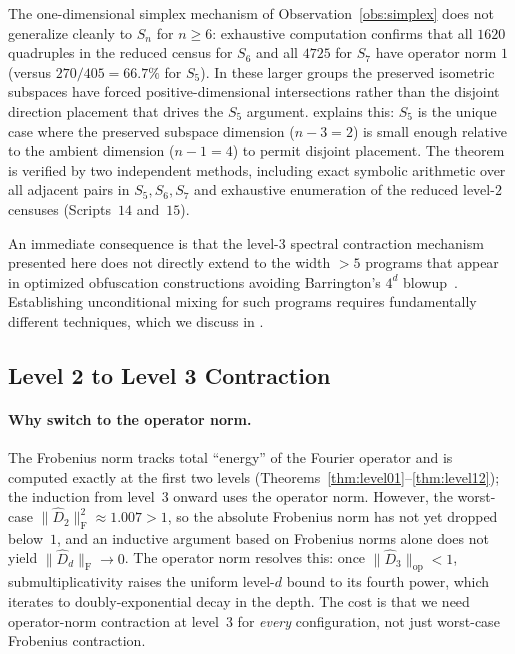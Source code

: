 \documentclass[version=final]{iacrcc}
\newcommand{\norm}[1]{\lVert #1 \rVert}
\newcommand{\frob}[1]{\norm{#1}_{\mathrm{F}}}
\newcommand{\opn}[1]{\norm{#1}_{\mathrm{op}}}
\newcommand{\Dhat}{\widehat{D}}
\begin{document}
\begin{remark}
The one-dimensional simplex mechanism of Observation~\ref{obs:simplex} does not
generalize cleanly to $S_n$ for $n \geq 6$: exhaustive computation confirms
that all $1620$ quadruples in the reduced census for $S_6$ and all $4725$ for $S_7$ have
operator norm $1$ (versus $270/405 = 66.7\%$ for $S_5$).  In these larger
groups the preserved isometric subspaces have forced positive-dimensional
intersections rather than the disjoint direction placement that drives the
$S_5$ argument.  explains this: $S_5$ is the unique
case where the preserved subspace dimension ($n-3 = 2$) is small enough
relative to the ambient dimension ($n-1 = 4$) to permit disjoint placement.
The theorem is verified by two independent methods, including exact symbolic
arithmetic over all adjacent pairs in $S_5, S_6, S_7$ and exhaustive
enumeration of the reduced level-$2$ censuses (Scripts~$14$ and~$15$).
\end{remark}

An immediate consequence is that the level-$3$ spectral contraction mechanism
presented here does not directly extend to the width $> 5$ programs that appear
in optimized obfuscation constructions avoiding Barrington's $4^d$
blowup~\cite{AGIS14}. Establishing unconditional mixing for such programs
requires fundamentally different techniques, which we discuss in
.


\subsection{Level 2 to Level 3 Contraction}

\paragraph{Why switch to the operator norm.}
The Frobenius norm tracks total ``energy'' of the Fourier operator and is
computed exactly at the first two levels (Theorems~\ref{thm:level01}--\ref{thm:level12});
the induction from level~$3$ onward uses the operator norm.
However, the worst-case $\frob{\Dhat_2}^2 \approx 1.007 > 1$, so the
absolute Frobenius norm has not yet dropped below~$1$, and an inductive
argument based on Frobenius norms alone does not yield $\frob{\Dhat_d} \to 0$.
The operator norm resolves this: once $\opn{\Dhat_3} < 1$,
submultiplicativity raises the uniform level-$d$ bound to its fourth power,
which iterates to doubly-exponential decay in the depth.  The cost is that we need
operator-norm contraction at level~$3$ for \emph{every} configuration,
not just worst-case Frobenius contraction.
\end{document}
